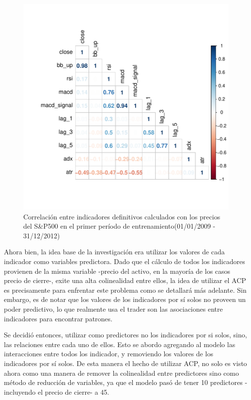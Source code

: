 \documentclass[a4paper,12pt]{Latex/Classes/PhDthesisPSnPDF}
\begin{document}
\begin{figure}[H]
\centering
\includegraphics{main-004}
\caption{Correlación entre indicadores definitivos calculados con los precios del S\&P500 en el primer período de entrenamiento(01/01/2009 - 31/12/2012)}
\end{figure}

Ahora bien, la idea base de la investigación era utilizar los valores de cada indicador como variables predictora. Dado que el cálculo de todos los indicadores provienen de la misma variable -precio del activo, en la mayoría de los casos precio de cierre-, exite una alta colinealidad entre ellos, la idea de utilizar el ACP es precisamente para enfrentar este problema como se detallará más adelante. Sin embargo, es de notar que los valores de los indicadores por sí solos no proveen un poder predictivo, lo que realmente usa el trader son las asociaciones entre indicadores para encontrar patrones. 

Se decidió entonces, utilizar como predictores no los indicadores por si solos, sino, las relaciones entre cada uno de ellos. Esto se abordo agregando al modelo las interacciones entre todos los indicador, y removiendo los valores de los indicadores por sí solos. De esta manera el hecho de utilizar ACP, no solo es visto ahora como una manera de remover la colinealidad entre predictores sino como método de reducción de variables, ya que el modelo pasó de tener 10 predictores -incluyendo el precio de cierre- a 45.
\end{document}
